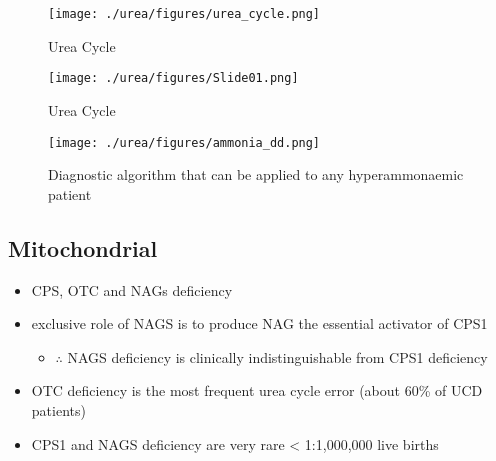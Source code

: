 \documentclass{scrartcl}
\begin{document}
\begin{figure}[htbp]
\centering
\texttt{[image: ./urea/figures/urea\_cycle.png]}
\caption{\label{fig:orgb7d4dae}
Urea Cycle}
\end{figure}


\begin{figure}[htbp]
\centering
\texttt{[image: ./urea/figures/Slide01.png]}
\caption{\label{fig:orga094906}
Urea Cycle}
\end{figure}


\begin{figure}[htbp]
\centering
\texttt{[image: ./urea/figures/ammonia\_dd.png]}
\caption{\label{fig:org304d32e}
Diagnostic algorithm that can be applied to any hyperammonaemic patient}
\end{figure}

\subsection{Mitochondrial}
\label{sec:orgb6366b1}
\begin{itemize}
\item CPS, OTC and NAGs deficiency
\item exclusive role of NAGS is to produce NAG the essential activator of CPS1
\begin{itemize}
\item \(\therefore\) NAGS deficiency is clinically indistinguishable from
CPS1 deficiency
\end{itemize}
\item OTC deficiency is the most frequent urea cycle error (about 60\% of UCD patients)
\item CPS1 and NAGS deficiency are very rare \textless{} 1:1,000,000 live births
\end{itemize}
\end{document}
